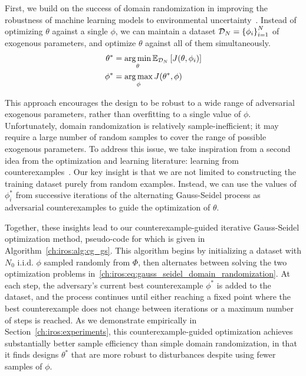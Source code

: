 First, we build on the success of domain randomization in improving the robustness of machine learning models to environmental uncertainty~\cite{tobinDomainRandomizationTransferring2017}. Instead of optimizing $\theta$ against a single $\phi$, we can maintain a dataset $\mathcal{D}_N = \left\{\phi_i\right\}_{i=1}^N$ of exogenous parameters, and optimize $\theta$ against all of them simultaneously.
\begin{subequations}
	\begin{align}\label{ch:iros:eq:gauss_seidel_domain_randomization}
		\theta^* & = \operatorname*{arg\,min}_\theta \mathbb{E}_{\mathcal{D}_N} \left[ J(\theta, \phi_i) \right] \\
		\phi^*   & = \operatorname*{arg\,max}_\phi J(\theta^*, \phi)
	\end{align}
\end{subequations}

This approach encourages the design to be robust to a wide range of adversarial exogenous parameters, rather than overfitting to a single value of $\phi$. Unfortunately, domain randomization is relatively sample-inefficient; it may require a large number of random samples to cover the range of possible exogenous parameters. To address this issue, we take inspiration from a second idea from the optimization and learning literature: learning from counterexamples~\cite{changNeuralLyapunovControl2019}. Our key insight is that we are not limited to constructing the training dataset purely from random examples. Instead, we can use the values of $\phi^*_i$ from successive iterations of the alternating Gauss-Seidel process as adversarial counterexamples to guide the optimization of $\theta$.

Together, these insights lead to our counterexample-guided iterative Gauss-Seidel optimization method, pseudo-code for which is given in Algorithm~\ref{ch:iros:alg:cg_gs}. This algorithm begins by initializing a dataset with $N_0$ i.i.d. $\phi$ sampled randomly from $\Phi$, then alternates between solving the two optimization problems in~\eqref{ch:iros:eq:gauss_seidel_domain_randomization}. At each step, the adversary's current best counterexample $\phi^*$ is added to the dataset, and the process continues until either reaching a fixed point where the best counterexample does not change between iterations or a maximum number of steps is reached. As we demonstrate empirically in Section~\ref{ch:iros:experiments}, this counterexample-guided optimization achieves substantially better sample efficiency than simple domain randomization, in that it finds designs $\theta^*$ that are more robust to disturbances despite using fewer samples of $\phi$.

